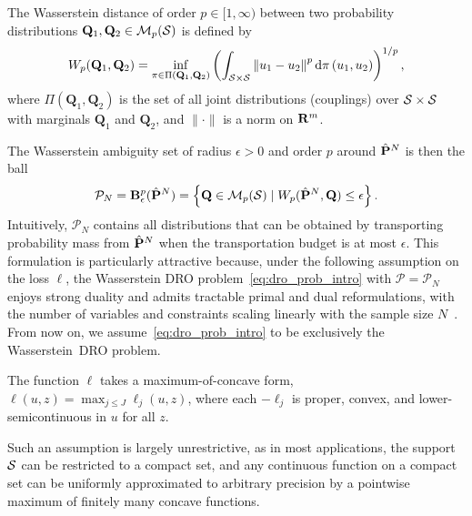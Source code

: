 \begin{definition}
\label{def:wass}
The Wasserstein distance of order $p \in [1,\infty)$ between two probability distributions $\mathbf{Q}_1,\mathbf{Q}_2 \in \mathcal{M}_p(\mathcal{S})$ is defined by
\begin{equation}
\label{eq:wass_dist}
W_{p}(\mathbf{Q}_1, \mathbf{Q}_2)=\inf _{\pi \in \Pi(\mathbf{Q}_1, \mathbf{Q}_2)} \left (\int_{\mathcal{S} \times \mathcal{S}} \left\|u_1-u_2\right\|^{p} \mathrm{d} \pi\left(u_1, u_2\right)\right)^{1/{p}},
\end{equation}
where $\Pi(\mathbf{Q}_1, \mathbf{Q}_2)$ is the set of all joint distributions (couplings) over $\mathcal{S} \times \mathcal{S}$ with marginals $\mathbf{Q}_1$ and $\mathbf{Q}_2$, and $\|\cdot\|$ is a norm on ${\mathbf R}^m$.
\end{definition}
The Wasserstein ambiguity set of radius $\epsilon > 0$ and order $p$ around $\hat{{\mathbf P}}^N$ is then the ball
\begin{equation}
\label{eq:wass_ball}
\mathcal{P}_N = \mathbf{B}_\epsilon^p (\hat{{\mathbf P}}^N) = \left\{\mathbf{Q} \in \mathcal{M}_p(\mathcal{S}) \mid W_p(\hat{{\mathbf P}}^N,\mathbf{Q}) \leq \epsilon \right\}.
\end{equation}
Intuitively, $\mathcal{P}_N$ contains all distributions that can be obtained by transporting probability mass from $\hat{{\mathbf P}}^N$ when the transportation budget is at most $\epsilon$.
This formulation is particularly attractive because, under the following assumption on the loss $\ell$, the Wasserstein DRO problem~\eqref{eq:dro_prob_intro} with $\mathcal{P} = \mathcal{P}_N$ enjoys strong duality and admits tractable primal and dual reformulations, with the number of variables and constraints scaling linearly with the sample size $N$~\citep{kuhn2019wasserstein}.
From now on, we assume~\eqref{eq:dro_prob_intro} to be exclusively the Wasserstein~\gls{DRO} problem. 
\begin{assumption}[Convexity]
  \label{ass:convex_l}
  The function $\ell$ takes a maximum-of-concave form, $\ell(u,z) = \max_{j \leq J} \ell_j(u, z)$, where each $-\ell_j$ is proper, convex, and lower-semicontinuous in $u$ for all $z$.
\end{assumption}
Such an assumption is largely unrestrictive, as in most applications, the support $\mathcal{S}$ can be restricted to a compact set, and any continuous function on a compact set can be uniformly approximated to arbitrary precision by a pointwise maximum of finitely many concave functions. 

